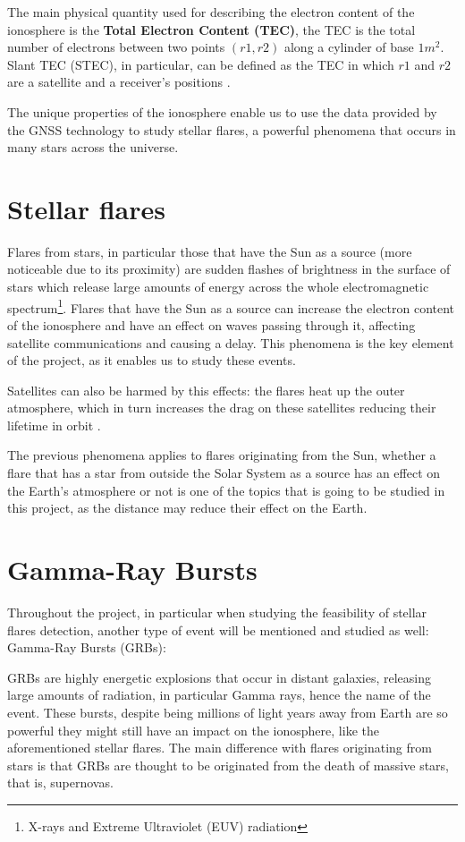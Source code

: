 The main physical quantity used for describing the electron content of the ionosphere is the \textbf{Total Electron Content (TEC)}, the TEC is the total number of electrons between two points $(r1,r2)$ along a cylinder of base $1m^2$. 
Slant TEC (STEC), in particular, can be defined as the TEC in which $r1$ and $r2$ are a satellite and a receiver’s positions \cite{singh2015gps}. 

The unique properties of the ionosphere enable us to use the data provided by the GNSS technology to study stellar flares, a powerful phenomena that occurs in many stars across the universe.

\section{Stellar flares}

Flares from stars, in particular those that have the Sun as a source (more noticeable due to its proximity) are sudden flashes of brightness in the surface of stars which release large amounts of energy across the whole electromagnetic spectrum\footnote{X-rays and Extreme Ultraviolet (EUV) radiation}.
Flares that have the Sun as a source can increase the electron content of the ionosphere and have an effect on waves passing through it, affecting satellite communications and causing a delay. This phenomena is the key element of the project, as it enables us to study these events.

Satellites can also be harmed by this effects: the flares heat up the outer atmosphere, which in turn increases the drag on these satellites reducing their lifetime in orbit \cite{hernandez2012gnss}.

The previous phenomena applies to flares originating from the Sun, whether a flare that has a star from outside the Solar System as a source has an effect on the Earth’s atmosphere or not is one of the topics that is going to be studied in this project, as the distance may reduce their effect on the Earth.

\section{Gamma-Ray Bursts}

Throughout the project, in particular when studying the feasibility of stellar flares detection, another type of event will be mentioned and studied as well: Gamma-Ray Bursts (GRBs):

GRBs are highly energetic explosions that occur in distant galaxies, releasing large amounts of radiation, in particular Gamma rays, hence the name of the event. These bursts, despite being millions of light years away from Earth are so powerful they might still have an impact on the ionosphere, like the aforementioned stellar flares. 
The main difference with flares originating from stars is that GRBs are thought to be originated from the death of massive stars, that is, supernovas.

